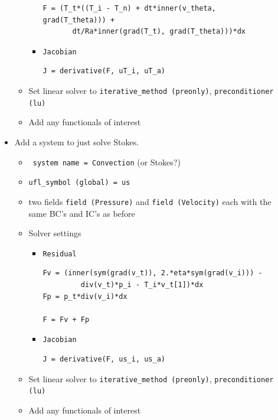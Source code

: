 \begin{description}
\begin{itemize}
\begin{itemize}
\begin{itemize}
\begin{lstlisting}[style=ufl]
F = (T_t*((T_i - T_n) + dt*inner(v_theta, grad(T_theta))) +
       dt/Ra*inner(grad(T_t), grad(T_theta)))*dx
        \end{lstlisting}
\item \texttt{Jacobian}
        \begin{lstlisting}[style=ufl]
J = derivative(F, uT_i, uT_a)
        \end{lstlisting}
      \end{itemize}
    \item Set linear solver to \texttt{iterative\_method (preonly)},
      \texttt{preconditioner (lu)}
    \item Add any functionals of interest

    \end{itemize}

  \item Add a system to just solve Stokes.
    \begin{itemize}
    \item \texttt{ system name = Convection} (or Stokes?)
    \item \texttt{ufl\_symbol (global) = us}
    \item two fields \texttt{field (Pressure)} and \texttt{field
        (Velocity)} each  with the same BC's
      and IC's as before
    \item Solver settings
      \begin{itemize}
      \item \texttt{Residual}
        \begin{lstlisting}[style=ufl]
Fv = (inner(sym(grad(v_t)), 2.*eta*sym(grad(v_i))) - 
         div(v_t)*p_i - T_i*v_t[1])*dx
Fp = p_t*div(v_i)*dx

F = Fv + Fp          
        \end{lstlisting}
\item \texttt{Jacobian}
        \begin{lstlisting}[style=ufl]
J = derivative(F, us_i, us_a)
        \end{lstlisting}
      \end{itemize}
    \item Set linear solver to \texttt{iterative\_method (preonly)},
      \texttt{preconditioner (lu)}
    \item Add any functionals of interest
    \end{itemize}
  \end{itemize}
\end{description}




